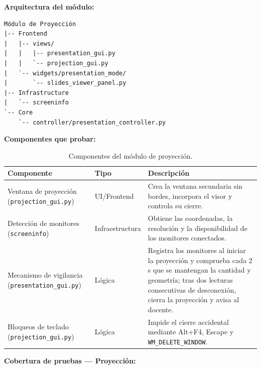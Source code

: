 \documentclass[11pt]{article}
\begin{document}
\textbf{Arquitectura del módulo:}
\begin{verbatim}
Módulo de Proyección
|-- Frontend
|   |-- views/
|   |   |-- presentation_gui.py
|   |   `-- projection_gui.py
|   `-- widgets/presentation_mode/
|       `-- slides_viewer_panel.py
|-- Infrastructure
|   `-- screeninfo
`-- Core
    `-- controller/presentation_controller.py
\end{verbatim}

\clearpage
\textbf{Componentes que probar:}

\begin{table}[H]
    \centering
    \begin{tabular}{|L{0.34\textwidth}|L{0.18\textwidth}|L{0.38\textwidth}|}
        \hline
        \textbf{Componente} & \textbf{Tipo} & \textbf{Descripción} \\ \hline
        Ventana de proyección (\texttt{projection\_gui.py}) & UI/Frontend & Crea la ventana secundaria sin bordes, incorpora el visor y controla su cierre. \\ \hline
        Detección de monitores (\texttt{screeninfo}) & Infraestructura & Obtiene las coordenadas, la resolución y la disponibilidad de los monitores conectados. \\ \hline
        Mecanismo de vigilancia (\texttt{presentation\_gui.py}) & Lógica & Registra los monitores al iniciar la proyección y comprueba cada 2 s que se mantengan la cantidad y geometría; tras dos lecturas consecutivas de desconexión, cierra la proyección y avisa al docente. \\ \hline
        Bloqueos de teclado (\texttt{projection\_gui.py}) & Lógica & Impide el cierre accidental mediante Alt+F4, Escape y \texttt{WM\_DELETE\_WINDOW}. \\ \hline
    \end{tabular}
    \caption{Componentes del módulo de proyección.}
    \label{tab:componentes-modulo-proyeccion}
\end{table}

\textbf{Cobertura de pruebas --- Proyección:}
\end{document}
